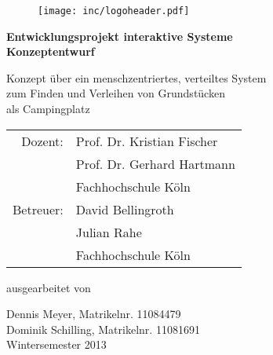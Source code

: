 
\begin{titlepage}

\begin{center}

\begin{figure}[!ht]
	\centering
		\texttt{[image: inc/logoheader.pdf]}
\end{figure}

\vspace{4.0cm}

\begin{Huge}
	\textbf{Entwicklungsprojekt interaktive Systeme}\\
	\vspace{0.1cm}
	\textbf{Konzeptentwurf}\\
\end{Huge}

\vspace{0.8cm}

\begin{LARGE}
	Konzept über ein menschzentriertes, verteiltes System\\
	\vspace{0.1cm}
	zum Finden und Verleihen von Grundstücken\\
	\vspace{0.1cm}
	als Campingplatz\\
\end{LARGE}

\vspace{2.5cm}

\begin{tabular}{rl}
        Dozent:  &  Prof. Dr. Kristian Fischer\\
       		 	 &  Prof. Dr. Gerhard Hartmann\\
       			 &  \small Fachhochschule Köln \\[1.0em]
      Betreuer:  &  David Bellingroth\\
				 &  Julian Rahe\\
       			 &  \small Fachhochschule Köln\\
\end{tabular}

\vspace{2.0cm}

\begin{large}
	ausgearbeitet von\\
	\vspace{0.2cm}
\end{large}

\begin{Large}
	Dennis Meyer, Matrikelnr. 11084479\\
	Dominik Schilling, Matrikelnr. 11081691\\
	\vspace{1cm}
	Wintersemester 2013
\end{Large}

\end{center}

\end{titlepage}
